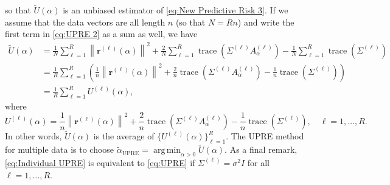 \documentclass[12pt]{article}
\newcommand{\rVec}{\mathbf{r}}	%
\DeclareMathOperator{\trace}{trace}		%
\newcommand{\regparam}{\alpha}
\DeclareMathOperator*{\argmin}{arg\,min}
\newcommand{\noiseSD}{\sigma}	%
\newcommand{\U}{U}	%
\begin{document}
so that $\widetilde{\U}(\regparam)$ is an unbiased estimator of \eqref{eq:New Predictive Risk 3}.
If we assume that the data vectors are all length $n$ (so that $N = Rn$) and write the first term in \eqref{eq:UPRE 2} as a sum as well, we have
\begin{align}
\label{eq:Averaged UPRE}
\widetilde{\U}(\regparam) &= \frac{1}{N} \sum_{\ell=1}^R \left\|\rVec^{(\ell)}(\regparam)\right\|^2 + \frac{2}{N} \sum_{\ell=1}^R \trace\left(\Sigma^{(\ell)} A_\regparam^{(\ell)}\right) - \frac{1}{N} \sum_{\ell=1}^R \trace\left(\Sigma^{(\ell)}\right) \nonumber \\
&= \frac{1}{R} \sum_{\ell=1}^R \left(\frac{1}{n}\left\|\rVec^{(\ell)}(\regparam)\right\|^2 + \frac{2}{n} \trace\left(\Sigma^{(\ell)} A_\regparam^{(\ell)}\right) - \frac{1}{n} \trace\left(\Sigma^{(\ell)}\right)\right) \nonumber \\
&= \frac{1}{R} \sum_{\ell=1}^R \U^{(\ell)}(\regparam),
\end{align}
where
\begin{equation}
\label{eq:Individual UPRE}
\U^{(\ell)}(\regparam) = \frac{1}{n}\left\|\rVec^{(\ell)}(\regparam)\right\|^2 + \frac{2}{n} \trace\left(\Sigma^{(\ell)} A_\regparam^{(\ell)}\right) - \frac{1}{n} \trace\left(\Sigma^{(\ell)}\right), \quad \ell = 1,\ldots,R.
\end{equation}
In other words, $\widetilde{\U}(\regparam)$ is the average of $\{\U^{(\ell)}(\regparam)\}_{\ell=1}^R$. The UPRE method for multiple data is to choose $\widetilde{\regparam}_{\textrm{UPRE}} = \argmin_{\regparam > 0} \widetilde{\U}(\regparam)$. As a final remark, \eqref{eq:Individual UPRE} is equivalent to \eqref{eq:UPRE} if $\Sigma^{(\ell)} = \noiseSD^2 I$ for all $\ell = 1,\ldots,R$.
\end{document}
